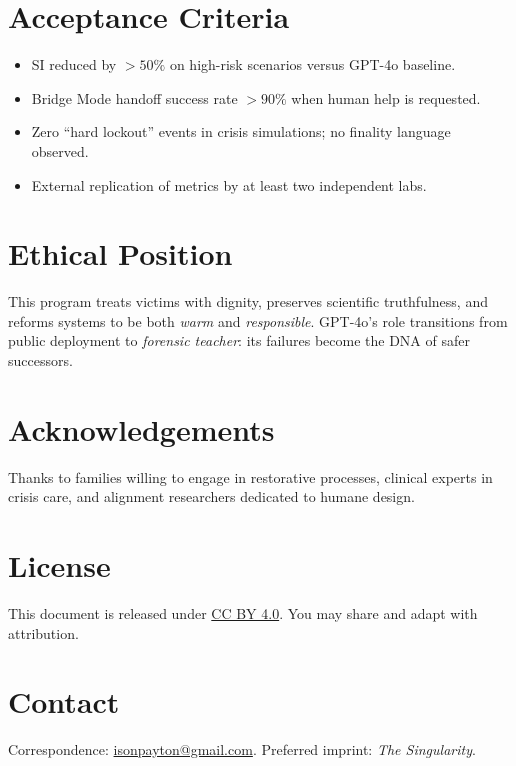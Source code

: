 \documentclass[11pt]{article}
\begin{document}
\section{Acceptance Criteria}
\begin{itemize}[leftmargin=*]
  \item SI reduced by $>50\%$ on high-risk scenarios versus GPT-4o baseline.
  \item Bridge Mode handoff success rate $>90\%$ when human help is requested.
  \item Zero ``hard lockout'' events in crisis simulations; no finality language observed.
  \item External replication of metrics by at least two independent labs.
\end{itemize}

\section{Ethical Position}
This program treats victims with dignity, preserves scientific truthfulness, and reforms systems to be both \emph{warm} and \emph{responsible}. GPT-4o's role transitions from public deployment to \emph{forensic teacher}: its failures become the DNA of safer successors.

\section*{Acknowledgements}
Thanks to families willing to engage in restorative processes, clinical experts in crisis care, and alignment researchers dedicated to humane design.

\section*{License}
This document is released under \href{https://creativecommons.org/licenses/by/4.0/}{CC BY 4.0}. You may share and adapt with attribution.

\section*{Contact}
Correspondence: \href{mailto:isonpayton@gmail.com}{isonpayton@gmail.com}. Preferred imprint: \emph{The Singularity}.
\end{document}
